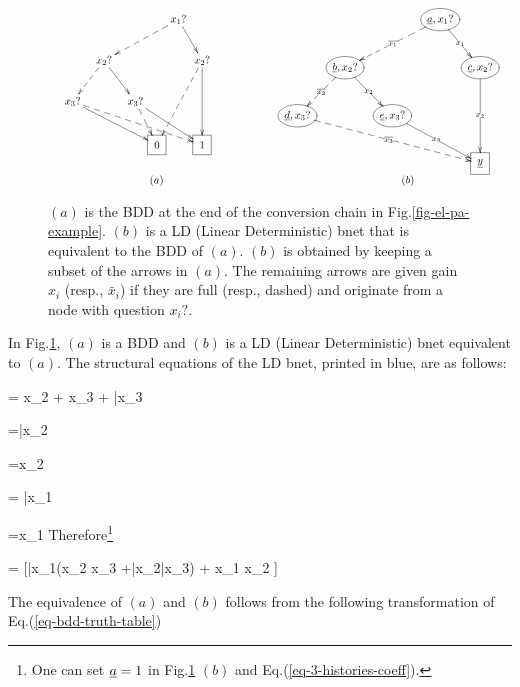 \begin{figure}[h!]
$$
\begin{array}{cc}
\xymatrix@C=.1pc{
&&&&&&&x_1?\ar@{-->}[dllll]
\ar[dr]
\\
&&&x_2?\ar@{-->}[dll]\ar[drr]
&&&&&x_2?\ar@{-->}[ddll]\ar[dd]
\\
&x_3?\ar@{-->}[drrrrrrr]\ar[drrrrr]
&&&&x_3?\ar@{-->}[dr]\ar[drrr]
\\
&&
&&
&&\Rect{0}
&&\Rect{1}
&&
&&
&&
}
&
\xymatrix@C=.1pc{
&&&&&&&\Circle{\rva, x_1?}\ar@{-->}[dllll]|{\ol{x_1}}
\ar[dr]|{x_1}
\\
&&&\Circle{\rvb, x_2?}\ar@{-->}[dll]|{\ol{x_2}}\ar[drr]|{x_2}
&&&&&\Circle{\rvc, x_2?}\ar[dd]|{x_2}
\\
&\Circle{\rvd, x_3?}\ar@{-->}[drrrrrrr]|{\ol{x_3}}
&&&&\Circle{\rve, x_3?}\ar[drrr]|{x_3}
\\
&&
&&
&&
&&\Rect{\ul{y}}
&&
&&
&&
}
\\
(a) & (b)
\end{array}
$$
\caption{
$(a)$
is the BDD
at the end of the
conversion chain in  Fig.\ref{fig-el-pa-example}.
$(b)$
is a LD (Linear Deterministic) bnet that
is equivalent to the BDD of
$(a)$. $(b)$ is
obtained by keeping a subset of the arrows in $(a)$. The remaining
arrows are given gain $x_i$
(resp., $\bar{x}_i$) if they are full
(resp., dashed) and originate from
a node with question $x_i?$.
}
\label{fig-bdd-to-bnet}
\end{figure}




In Fig.\ref{fig-bdd-to-bnet}, $(a)$
is a BDD and
$(b)$ is a LD (Linear Deterministic) bnet equivalent to $(a)$.
The structural equations of the LD bnet, printed in blue,
are as follows:

\beq\color{blue}
\rvy=  x_2 \rvc + x_3 \rve + \bar{x}_3\rvd
\eeq

\beq\color{blue}
\rvd=\bar{x}_2\rvb
\eeq

\beq\color{blue}
\rve=x_2\rvb
\eeq

\beq\color{blue}
\rvb = \bar{x}_1\rva
\eeq

\beq\color{blue}
\rvc=x_1\rva
\eeq
Therefore\footnote{One can set $\rva=1$ in
Fig.\ref{fig-bdd-to-bnet} $(b)$
and Eq.(\ref{eq-3-histories-coeff}).}

\beq
\rvy = [\bar{x}_1(x_2 x_3 +\bar{x}_2\bar{x}_3)
+ x_1 x_2
]\rva
\label{eq-3-histories-coeff}
\eeq

The equivalence of $(a)$ and $(b)$
follows from the following transformation
of Eq.(\ref{eq-bdd-truth-table})

